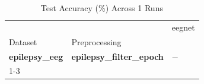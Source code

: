 \begin{table}
\caption{Test Accuracy (\%) Across 1 Runs}
\label{tab:results_acc}
\begin{tabular}{lll}
\toprule
 &  & eegnet \\
Dataset & Preprocessing &  \\
\midrule
\textbf{epilepsy_eeg} & \textbf{epilepsy_filter_epoch} & $-$ \\
\cline{1-3}
\bottomrule
\end{tabular}
\end{table}
